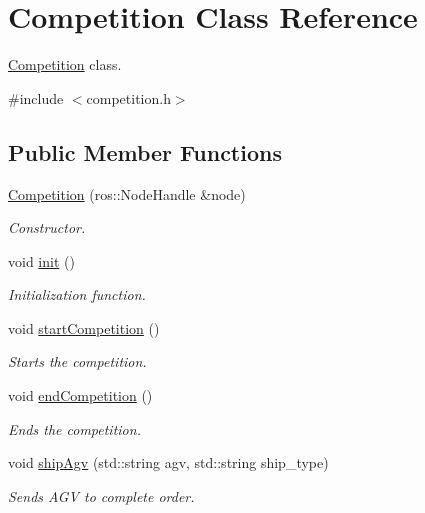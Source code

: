 \hypertarget{classCompetition}{}\section{Competition Class Reference}
\label{classCompetition}


\hyperlink{classCompetition}{Competition} class.  




{\ttfamily \#include $<$competition.\+h$>$}

\subsection*{Public Member Functions}
\begin{DoxyCompactItemize}
\item 
\hyperlink{classCompetition_a3d8b50d07d2424bd18743148237da31c}{Competition} (ros\+::\+Node\+Handle \&node)
\begin{DoxyCompactList}\small\item\em Constructor. \end{DoxyCompactList}\item 
void \hyperlink{classCompetition_af5400538e024248fc99f83cf26ca2f23}{init} ()
\begin{DoxyCompactList}\small\item\em Initialization function. \end{DoxyCompactList}\item 
void \hyperlink{classCompetition_a2505fb69a74ff70530c033c144f7f024}{start\+Competition} ()
\begin{DoxyCompactList}\small\item\em Starts the competition. \end{DoxyCompactList}\item 
void \hyperlink{classCompetition_a894a450b89f8d61d83f02f221fb1b0eb}{end\+Competition} ()
\begin{DoxyCompactList}\small\item\em Ends the competition. \end{DoxyCompactList}\item 
void \hyperlink{classCompetition_a0f5358904edd5675f14fc378b217f3f9}{ship\+Agv} (std\+::string agv, std\+::string ship\+\_\+type)
\begin{DoxyCompactList}\small\item\em Sends A\+GV to complete order. \end{DoxyCompactList}\item 

\end{DoxyCompactItemize}
